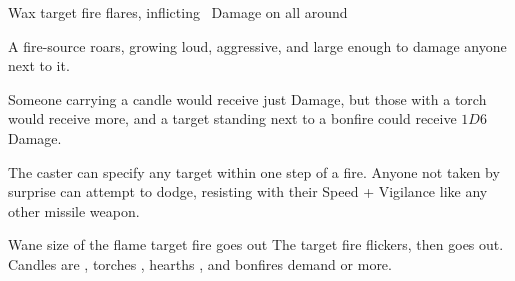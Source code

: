   {\mFire}%
  {Wax}%
  {}%
  {}%
  {target fire flares, inflicting \rollConv\ Damage on all around}%
  {
    A fire-source roars, growing loud, aggressive, and large enough to damage anyone next to it.

    Someone carrying a candle would receive just  Damage, but those with a torch would receive more, and a target standing next to a bonfire could receive $1D6$ Damage.

    The caster can specify any target within one step of a fire.
    Anyone not taken by surprise can attempt to dodge, resisting with their Speed + Vigilance like any other missile weapon.
  }

  {\mFire}%
  {Wane}%
  {}%
  {size of the flame}%
  {target fire goes out}%
  {
    The target fire flickers, then goes out.
    Candles are \tn[6], torches \tn[7], hearths \tn[8], and bonfires demand \tn[9] or more.
  }
